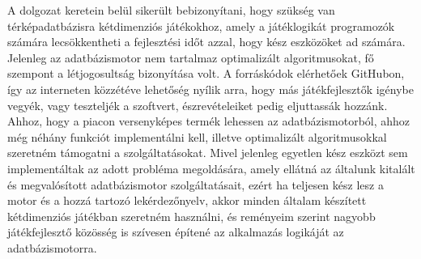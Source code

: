 
A dolgozat keretein belül sikerült bebizonyítani, hogy szükség van térképadatbázisra kétdimenziós játékokhoz, amely a játéklogikát programozók számára lecsökkentheti a fejlesztési időt azzal, hogy kész eszközöket ad számára. Jelenleg az adatbázismotor nem tartalmaz optimalizált algoritmusokat, fő szempont a létjogosultság bizonyítása volt. A forráskódok elérhetőek GitHubon, így az interneten közzétéve lehetőség nyílik arra, hogy más játékfejlesztők igénybe vegyék, vagy teszteljék a szoftvert, észrevételeiket pedig eljuttassák hozzánk. Ahhoz, hogy a piacon versenyképes termék lehessen az adatbázismotorból, ahhoz még néhány funkciót implementálni kell, illetve optimalizált algoritmusokkal szeretném támogatni a szolgáltatásokat. Mivel jelenleg egyetlen kész eszközt sem implementáltak az adott probléma megoldására, amely ellátná az általunk kitalált és megvalósított adatbázismotor szolgáltatásait, ezért ha teljesen kész lesz a motor és a hozzá tartozó lekérdezőnyelv, akkor minden általam készített kétdimenziós játékban szeretném használni, és reményeim szerint nagyobb játékfejlesztő közösség is szívesen építené az alkalmazás logikáját az adatbázismotorra.
